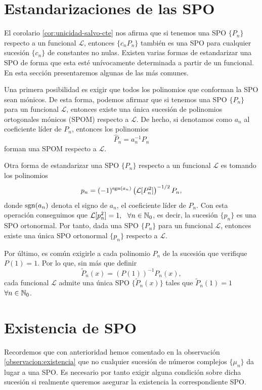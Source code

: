 \section{Estandarizaciones de las SPO}

El corolario \ref{cor:unicidad-salvo-cte} nos afirma que si tenemos una SPO $\{P_n\}$ respecto a un funcional $\mathcal L$, entonces $\{c_n P_n\}$ también es una SPO para cualquier sucesión $\{c_n\}$ de constantes no nulas. Existen varias formas de estandarizar una SPO de forma que esta esté unívocamente determinada a partir de un funcional. En esta sección presentaremos algunas de las más comunes.

Una primera posibilidad es exigir que todos los polinomios que conforman la SPO sean mónicos. De esta forma, podemos afirmar que si tenemos una SPO $\{P_n\}$ para un funcional $\mathcal L$, entonces existe una única sucesión de polinomios ortogonales mónicos (SPOM) respecto a $\mathcal L$. De hecho, si denotamos como $a_n$ al coeficiente líder de $P_n$, entonces los polinomios
$$
\hat P_n=a_n^{-1} P_n
$$
forman una SPOM respecto a $\mathcal{L}$.

Otra forma de estandarizar una SPO $\{P_n\}$ respecto a un funcional $\mathcal L$ es tomando los polinomios 
$$
p_n = (-1)^{\mathrm{sgn}(a_n)}\left(\mathcal L[P_n^2]\right)^{-1/2} P_n,
$$
donde $\mathrm{sgn}(a_n)$ denota el signo de $a_n$, el coeficiente líder de $P_n$. Con esta operación conseguimos que $\mathcal L[p_n^2] = 1, \ \ \forall n\in\mathbb{N}_0$, es decir, la sucesión $\{p_n\}$ es una SPO ortonormal. Por tanto, dada una SPO $\{P_n\}$ para un funcional $\mathcal L$, entonces existe una única SPO ortonormal $\{p_n\}$ respecto a $\mathcal{L}$.

Por último, es común exigirle a cada polinomio $P_n$ de la sucesión que verifique $P(1)=1$. Por lo que, sin más que definir
$$
\tilde{P}_n(x) = (P(1))^{-1}P_n(x),
$$
cada funcional $\mathcal{L}$ admite una única SPO $\{\tilde{P}_n(x)\}$ tales que $\tilde{P}_n(1)=1$ $\forall n\in\mathbb{N}_0$.




\section{Existencia de SPO}
\label{section:existencia-SPO}

Recordemos que con anterioridad hemos comentado en la observación \ref{observacion:existencia} que no cualquier sucesión de números complejos $\{\mu_n\}$ da lugar a una SPO. Es necesario por tanto exigir alguna condición sobre dicha sucesión si realmente queremos asegurar la existencia la correspondiente SPO.

